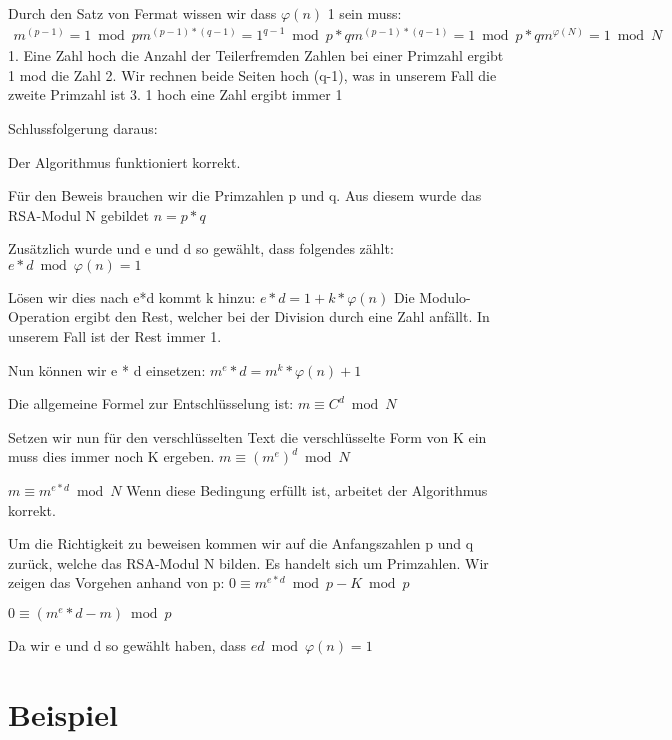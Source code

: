 Durch den Satz von Fermat wissen wir dass $ \varphi(n) $ 1 sein muss:
\begin{align}
  m^{(p-1)} = 1 \bmod p
  m^{(p-1)*(q-1)} = 1^{q-1} \bmod p*q
  m^{(p-1)*(q-1)} = 1 \bmod p*q
  m^{\varphi(N)} = 1 \bmod N
\end{align}
1. Eine Zahl hoch die Anzahl der Teilerfremden Zahlen bei einer Primzahl ergibt 1 mod die Zahl
2. Wir rechnen beide Seiten hoch (q-1), was in unserem Fall die zweite Primzahl ist %
3. 1 hoch eine Zahl ergibt immer 1

Schlussfolgerung daraus:
 
 Der Algorithmus funktioniert korrekt. 


Für den Beweis brauchen wir die Primzahlen p und q. Aus diesem wurde das RSA-Modul N gebildet
$ n = p * q $

Zusätzlich wurde und e und d so gewählt, dass folgendes zählt:
$ e * d \bmod \varphi(n) = 1 $

Lösen wir dies nach e*d kommt k hinzu:
$ e * d = 1 + k * \varphi(n) $
Die Modulo-Operation ergibt den Rest, welcher bei der Division durch eine Zahl anfällt. In unserem Fall ist der Rest immer 1.

Nun können wir e * d einsetzen:
$ m^e*d = m^k*\varphi(n)+1 $


Die allgemeine Formel zur Entschlüsselung ist:
$ m \equiv C^d \bmod N $

Setzen wir nun für den verschlüsselten Text die verschlüsselte Form von K ein muss dies immer noch K ergeben.
$ m \equiv (m^e)^d \bmod N $

$ m \equiv m^{e*d} \bmod N $
Wenn diese Bedingung erfüllt ist, arbeitet der Algorithmus korrekt.

Um die Richtigkeit zu beweisen kommen wir auf die Anfangszahlen p und q zurück, welche das RSA-Modul N bilden. Es handelt sich um Primzahlen. Wir zeigen das Vorgehen anhand von p:
$ 0 \equiv m^{e*d} \bmod p - K \bmod p $

$ 0 \equiv (m^e*d-m) \bmod p $

Da wir e und d so gewählt haben, dass 
$ ed \bmod \varphi(n) = 1 $ 


\section{Beispiel}
